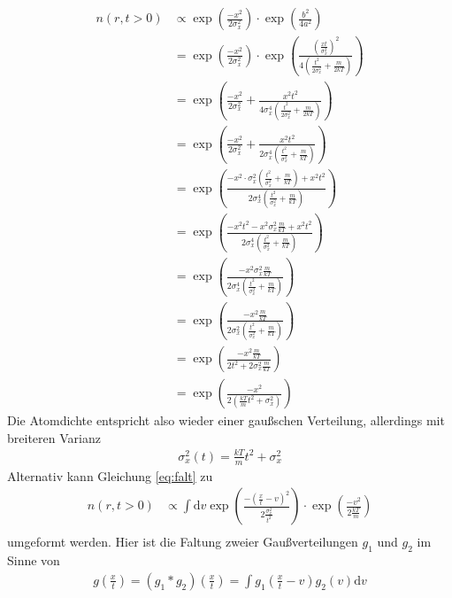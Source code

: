 \documentclass[10pt,a4paper]{extarticle}
\begin{document}
\begin{align}
n(r, t> 0) &\varpropto \exp\left(\frac{-x^2}{2 \sigma_x^2}\right) \cdot \exp \left(\frac{b^2}{4a^2}\right) \\
&= \exp\left(\frac{-x^2}{2 \sigma_x^2}\right) \cdot \exp \left(\frac{\left( \frac{xt}{\sigma_x^2}\right)^2}{4\left(\frac{t^2}{2 \sigma_x^2} + \frac{m}{2kT} \right)}\right) \\
&= \exp\left(\frac{-x^2}{2 \sigma_x^2} + \frac{x^2t^2}{4\sigma_x^4\left(\frac{t^2}{2 \sigma_x^2} + \frac{m}{2kT} \right)}\right) \\
&= \exp\left(\frac{-x^2}{2 \sigma_x^2} + \frac{x^2t^2}{2\sigma_x^4\left(\frac{t^2}{\sigma_x^2} + \frac{m}{kT} \right)}\right) \\
&= \exp\left(\frac{-x^2 \cdot \sigma_x^2\left(\frac{t^2}{\sigma_x^2} + \frac{m}{kT} \right) +x^2t^2}{2\sigma_x^4\left(\frac{t^2}{\sigma_x^2} + \frac{m}{kT} \right)}\right) \\
&= \exp\left(\frac{-x^2 t^2 -  x^2 \sigma_x^2 \frac{m}{kT} +x^2t^2}{2\sigma_x^4\left(\frac{t^2}{\sigma_x^2} + \frac{m}{kT} \right)}\right) \\
&= \exp\left(\frac{- x^2 \sigma_x^2 \frac{m}{kT}}{2\sigma_x^4\left(\frac{t^2}{\sigma_x^2} + \frac{m}{kT} \right)}\right) \\
&= \exp\left(\frac{- x^2 \frac{m}{kT}}{2\sigma_x^2\left(\frac{t^2}{\sigma_x^2} + \frac{m}{kT} \right)}\right) \\
&= \exp\left(\frac{- x^2 \frac{m}{kT}}{2t^2 +2 \sigma_x^2 \frac{m}{kT} }\right) \\
&= \exp\left(\frac{- x^2 }{2\left(\frac{kT}{m}t^2 + \sigma_x^2\right)}\right) 
\end{align}
Die Atomdichte entspricht also wieder einer gaußschen Verteilung, allerdings mit breiteren Varianz
\begin{align}
\sigma_x^2 \left(t\right) = \frac{kT}{m}t^2 + \sigma_x^2 \label{final} 
\end{align}
Alternativ kann Gleichung \eqref{eq:falt} zu 
\begin{align}
n(r, t> 0) &\varpropto \int \mathrm{d}v \exp\left(\frac{-(\frac{x}{t}-v)^2}{2 \frac{\sigma_x^2}{t^2}}\right) \cdot \exp \left(\frac{-v^2}{2\frac{kT}{m}}\right) \\
\end{align}
umgeformt werden.
Hier ist die Faltung zweier Gaußverteilungen $g_1$ und $g_2$ im Sinne von
\begin{align}
g \left(\frac{x}{t}\right) = \left(g_1 * g_2\right) \left(\frac{x}{t}\right) = \int  g_1\left(\frac{x}{t}-v\right) g_2 \left(v\right)\mathrm{d}v
\end{align}
\end{document}
